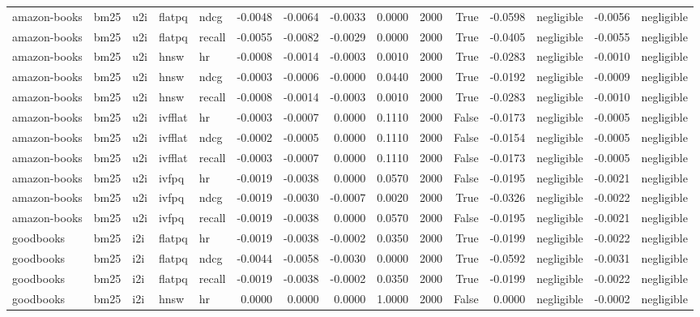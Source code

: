 \begin{tabular}{lllllrrrrrrrlrl}
amazon-books & bm25 & u2i & flatpq & ndcg & -0.0048 & -0.0064 & -0.0033 & 0.0000 & 2000 & True & -0.0598 & negligible & -0.0056 & negligible \\
amazon-books & bm25 & u2i & flatpq & recall & -0.0055 & -0.0082 & -0.0029 & 0.0000 & 2000 & True & -0.0405 & negligible & -0.0055 & negligible \\
amazon-books & bm25 & u2i & hnsw & hr & -0.0008 & -0.0014 & -0.0003 & 0.0010 & 2000 & True & -0.0283 & negligible & -0.0010 & negligible \\
amazon-books & bm25 & u2i & hnsw & ndcg & -0.0003 & -0.0006 & -0.0000 & 0.0440 & 2000 & True & -0.0192 & negligible & -0.0009 & negligible \\
amazon-books & bm25 & u2i & hnsw & recall & -0.0008 & -0.0014 & -0.0003 & 0.0010 & 2000 & True & -0.0283 & negligible & -0.0010 & negligible \\
amazon-books & bm25 & u2i & ivfflat & hr & -0.0003 & -0.0007 & 0.0000 & 0.1110 & 2000 & False & -0.0173 & negligible & -0.0005 & negligible \\
amazon-books & bm25 & u2i & ivfflat & ndcg & -0.0002 & -0.0005 & 0.0000 & 0.1110 & 2000 & False & -0.0154 & negligible & -0.0005 & negligible \\
amazon-books & bm25 & u2i & ivfflat & recall & -0.0003 & -0.0007 & 0.0000 & 0.1110 & 2000 & False & -0.0173 & negligible & -0.0005 & negligible \\
amazon-books & bm25 & u2i & ivfpq & hr & -0.0019 & -0.0038 & 0.0000 & 0.0570 & 2000 & False & -0.0195 & negligible & -0.0021 & negligible \\
amazon-books & bm25 & u2i & ivfpq & ndcg & -0.0019 & -0.0030 & -0.0007 & 0.0020 & 2000 & True & -0.0326 & negligible & -0.0022 & negligible \\
amazon-books & bm25 & u2i & ivfpq & recall & -0.0019 & -0.0038 & 0.0000 & 0.0570 & 2000 & False & -0.0195 & negligible & -0.0021 & negligible \\
goodbooks & bm25 & i2i & flatpq & hr & -0.0019 & -0.0038 & -0.0002 & 0.0350 & 2000 & True & -0.0199 & negligible & -0.0022 & negligible \\
goodbooks & bm25 & i2i & flatpq & ndcg & -0.0044 & -0.0058 & -0.0030 & 0.0000 & 2000 & True & -0.0592 & negligible & -0.0031 & negligible \\
goodbooks & bm25 & i2i & flatpq & recall & -0.0019 & -0.0038 & -0.0002 & 0.0350 & 2000 & True & -0.0199 & negligible & -0.0022 & negligible \\
goodbooks & bm25 & i2i & hnsw & hr & 0.0000 & 0.0000 & 0.0000 & 1.0000 & 2000 & False & 0.0000 & negligible & -0.0002 & negligible \\

\end{tabular}
